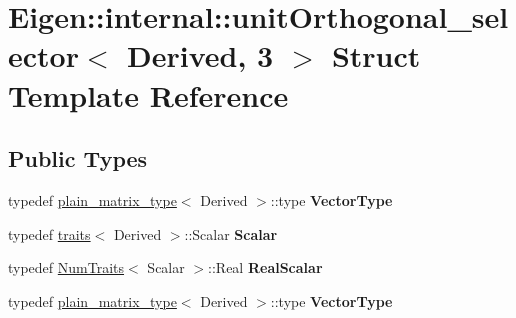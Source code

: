 \hypertarget{struct_eigen_1_1internal_1_1unit_orthogonal__selector_3_01_derived_00_013_01_4}{}\section{Eigen\+:\+:internal\+:\+:unit\+Orthogonal\+\_\+selector$<$ Derived, 3 $>$ Struct Template Reference}
\label{struct_eigen_1_1internal_1_1unit_orthogonal__selector_3_01_derived_00_013_01_4}
\subsection*{Public Types}
\begin{DoxyCompactItemize}
\item 
\mbox{\label{struct_eigen_1_1internal_1_1unit_orthogonal__selector_3_01_derived_00_013_01_4_a490c764e96311e88342fec0cf01ef187}} 
typedef \hyperlink{struct_eigen_1_1internal_1_1plain__matrix__type}{plain\+\_\+matrix\+\_\+type}$<$ Derived $>$\+::type {\bfseries Vector\+Type}
\item 
\mbox{\label{struct_eigen_1_1internal_1_1unit_orthogonal__selector_3_01_derived_00_013_01_4_a896fc4aa9d01f63b4a82c1bca43c61f9}} 
typedef \hyperlink{struct_eigen_1_1internal_1_1traits}{traits}$<$ Derived $>$\+::Scalar {\bfseries Scalar}
\item 
\mbox{\label{struct_eigen_1_1internal_1_1unit_orthogonal__selector_3_01_derived_00_013_01_4_a148fa71fd19ee3bd07ec2921a8a087c2}} 
typedef \hyperlink{group___core___module_struct_eigen_1_1_num_traits}{Num\+Traits}$<$ Scalar $>$\+::Real {\bfseries Real\+Scalar}
\item 
\mbox{\label{struct_eigen_1_1internal_1_1unit_orthogonal__selector_3_01_derived_00_013_01_4_a490c764e96311e88342fec0cf01ef187}} 
typedef \hyperlink{struct_eigen_1_1internal_1_1plain__matrix__type}{plain\+\_\+matrix\+\_\+type}$<$ Derived $>$\+::type {\bfseries Vector\+Type}
\item 

\end{DoxyCompactItemize}
